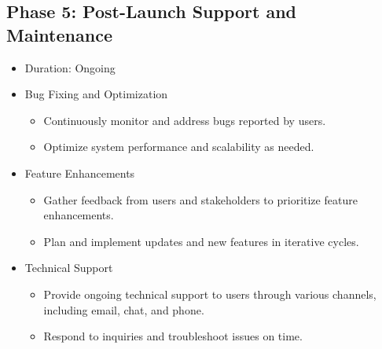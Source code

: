 \documentclass[12pt]{article}
\begin{document}
\subsection*{\fontsize{13}{0}\selectfont Phase 5: Post-Launch Support and Maintenance}

\begin{itemize}
    \item Duration: Ongoing
    \item Bug Fixing and Optimization
        \begin{itemize}
            \item Continuously monitor and address bugs reported by users.
            \item Optimize system performance and scalability as needed.
        \end{itemize}
    \item Feature Enhancements
        \begin{itemize}
            \item Gather feedback from users and stakeholders to prioritize feature enhancements.
            \item Plan and implement updates and new features in iterative cycles.
        \end{itemize}
    \item Technical Support
        \begin{itemize}
            \item Provide ongoing technical support to users through various channels, including email, chat, and phone.
            \item Respond to inquiries and troubleshoot issues on time.
        \end{itemize}
\end{itemize}
 
\end{document}
